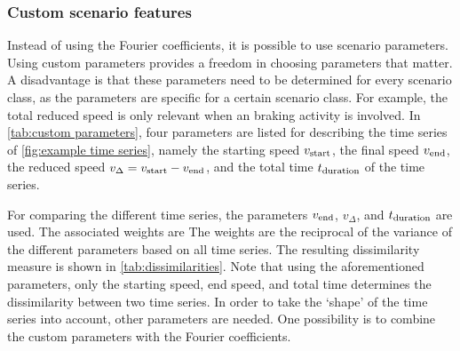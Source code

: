 \documentclass[10pt,final,a4paper,oneside,onecolumn]{article}
\newcommand{\parvstart}{v_{\textup{start}}}
\newcommand{\parvend}{v_{\textup{end}}}
\newcommand{\pardv}{v_{\Delta}}
\newcommand{\pardt}{t_{\textup{duration}}}
\theoremstyle{plain}\newtheorem{definition}{Definition}[section]    %
\theoremstyle{definition}\newtheorem{example}{Example}[section]     %
\theoremstyle{remark}\newtheorem{remarkenv}{Remark}[section]        %
\begin{document}
\begin{table}
	\centering
	\caption{Dissimilarity measures according to \cref{eq:eucl features}, with Fourier coefficients (see \cref{sec:fourier coefficient}), custom scenario features (see \cref{sec:custom features}), parameters of an auto-regression model fit (see \cref{sec:auto regression models}), and splines parameters (see \cref{sec:spline models}). The last column shows the dissimilarity measure of \cref{eq:dtw cost} divided over the sum of the number of samples of both time series (see \cref{sec:elastic measures}).}
	\label{tab:dissimilarities}
	
\end{table}


\subsubsection{Custom scenario features}
\label{sec:custom features}

Instead of using the Fourier coefficients, it is possible to use scenario parameters. Using custom parameters provides a freedom in choosing parameters that matter. A disadvantage is that these parameters need to be determined for every scenario class, as the parameters are specific for a certain scenario class. For example, the total reduced speed is only relevant when an braking activity is involved. In \cref{tab:custom parameters}, four parameters are listed for describing the time series of \cref{fig:example time series}, namely the starting speed $\parvstart$, the final speed $\parvend$, the reduced speed $\pardv=\parvstart-\parvend$, and the total time $\pardt$ of the time series.

\begin{table}
	\centering
	\caption{Custom parameters for describing the time series of \cref{fig:example time series}.}
	\label{tab:custom parameters}
	
\end{table}

For comparing the different time series, the parameters $\parvend$, $\pardv$, and $\pardt$ are used. The associated weights are 
The weights are the reciprocal of the variance of the different parameters based on all time series. The resulting dissimilarity measure is shown in \cref{tab:dissimilarities}. Note that using the aforementioned parameters, only the starting speed, end speed, and total time determines the dissimilarity between two time series. In order to take the `shape' of the time series into account, other parameters are needed. One possibility is to combine the custom parameters with the Fourier coefficients. 
\end{document}
